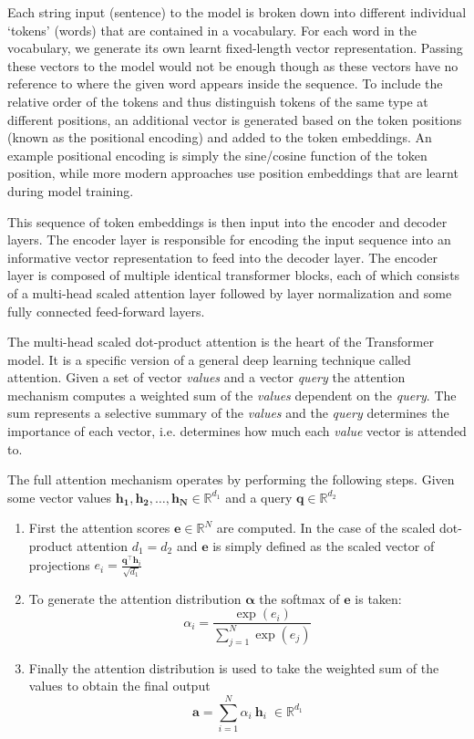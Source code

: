 Each string input (sentence) to the model is broken down into different individual `tokens' (words) that are contained in a vocabulary. For each word in the vocabulary, we generate its own learnt fixed-length vector representation. Passing these vectors to the model would not be enough though as these vectors have no reference to where the given word appears inside the sequence. To include the relative order of the tokens and thus distinguish tokens of the same type at different positions, an additional vector is generated based on the token positions (known as the positional encoding) and added to the token embeddings. An example positional encoding is simply the sine/cosine function of the token position, while more modern approaches use position embeddings that are learnt during model training.

This sequence of token embeddings is then input into the encoder and decoder layers. The encoder layer is responsible for encoding the input sequence into an informative vector representation to feed into the decoder layer. The encoder layer is composed of multiple identical transformer blocks, each of which consists of a multi-head scaled attention layer followed by layer normalization and some fully connected feed-forward layers.

The multi-head scaled dot-product attention is the heart of the Transformer model. It is a specific version of a general deep learning technique called attention. Given a set of vector \emph{values} and a vector \emph{query} the attention mechanism computes a weighted sum of the \emph{values} dependent on the \emph{query}. The sum represents a selective summary of the \emph{values} and the \emph{query} determines the importance of each vector, i.e. determines how much each \emph{value} vector is attended to. 

The full attention mechanism operates by performing the following steps. Given some vector values $\bm{h_1}, \bm{h_2},\dots, \bm{h_N} \in \mathbb{R} ^{d_1}$ and a query $\bm{q} \in \mathbb{R} ^{d_2}$ 

\begin{enumerate}
\item First the attention scores $\bm{e} \in \mathbb{R}^N$ are computed. In the case of the scaled dot-product attention $d_1=d_2$ and $\bm{e}$ is simply defined as the scaled vector of projections $e_i=\frac{\bm{q}^\intercal \bm{h}_i}{\sqrt{d_1}}$
\item To generate the attention distribution $\bm{\alpha}$ the softmax of $\bm{e}$ is taken: 
\begin{equation}
\alpha_i=\frac{\exp{(e_i)}}{\sum_{j=1}^N \exp{(e_j)}} 
\label{eqn:softmax}
\end{equation}
\item Finally the attention distribution is used to take the weighted sum of the values to obtain the final output
\begin{equation}
\bm{a}=\sum_{i=1}^N \alpha_i \: \bm{h}_i \; \in \mathbb{R}^{d_1}
\end{equation}
\end{enumerate}

